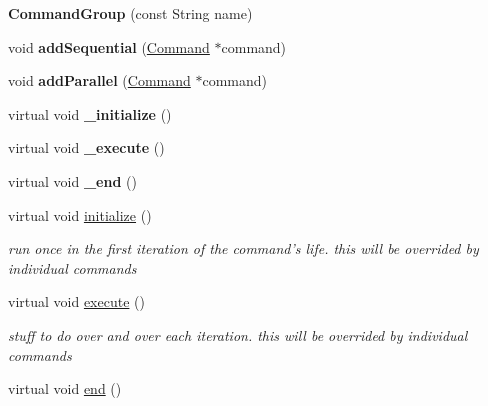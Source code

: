 \begin{DoxyCompactItemize}
\item 
\hypertarget{classCommandGroup_a0167d59d8a96fbc0c1999f19610c7358}{{\bfseries Command\-Group} (const String name)}\label{classCommandGroup_a0167d59d8a96fbc0c1999f19610c7358}

\item 
\hypertarget{classCommandGroup_a6b75192504dc74794651e0d82bb83488}{void {\bfseries add\-Sequential} (\hyperlink{classCommand}{Command} $\ast$command)}\label{classCommandGroup_a6b75192504dc74794651e0d82bb83488}

\item 
\hypertarget{classCommandGroup_a8709a47f6f44a6993cd9f705b360054b}{void {\bfseries add\-Parallel} (\hyperlink{classCommand}{Command} $\ast$command)}\label{classCommandGroup_a8709a47f6f44a6993cd9f705b360054b}

\item 
\hypertarget{classCommandGroup_aad0c9576993f9f8d2431cd44f0bf0072}{virtual void {\bfseries \-\_\-initialize} ()}\label{classCommandGroup_aad0c9576993f9f8d2431cd44f0bf0072}

\item 
\hypertarget{classCommandGroup_a09355b6bb1018bdadaa0f5a1c0dec007}{virtual void {\bfseries \-\_\-execute} ()}\label{classCommandGroup_a09355b6bb1018bdadaa0f5a1c0dec007}

\item 
\hypertarget{classCommandGroup_a11f0ae6eb2ba052138d5a8930f23bb4f}{virtual void {\bfseries \-\_\-end} ()}\label{classCommandGroup_a11f0ae6eb2ba052138d5a8930f23bb4f}

\item 
\hypertarget{classCommandGroup_a99800c5dbd05ab750aa0bb27518d0467}{virtual void \hyperlink{classCommandGroup_a99800c5dbd05ab750aa0bb27518d0467}{initialize} ()}\label{classCommandGroup_a99800c5dbd05ab750aa0bb27518d0467}

\begin{DoxyCompactList}\small\item\em run once in the first iteration of the command's life. this will be overrided by individual commands \end{DoxyCompactList}\item 
\hypertarget{classCommandGroup_a5e91d370cafde43548d79945ccb4d8fe}{virtual void \hyperlink{classCommandGroup_a5e91d370cafde43548d79945ccb4d8fe}{execute} ()}\label{classCommandGroup_a5e91d370cafde43548d79945ccb4d8fe}

\begin{DoxyCompactList}\small\item\em stuff to do over and over each iteration. this will be overrided by individual commands \end{DoxyCompactList}\item 
\hypertarget{classCommandGroup_a28ad3a1c2f6b4f9aea10efa1a824895e}{virtual void \hyperlink{classCommandGroup_a28ad3a1c2f6b4f9aea10efa1a824895e}{end} ()}\label{classCommandGroup_a28ad3a1c2f6b4f9aea10efa1a824895e}


\end{DoxyCompactItemize}

